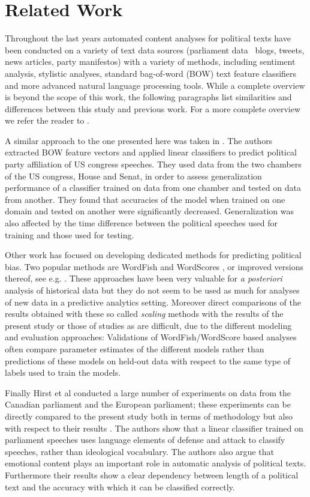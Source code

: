 \documentclass[runningheads,a4paper]{llncs}
\begin{document}
\section{Related Work}\label{sec:related}
Throughout the last years automated content analyses for political texts have been conducted on a variety of text data sources (parliament data \, blogs, tweets, news articles, party manifestos) with a variety of methods, including sentiment analysis, stylistic analyses, standard bag-of-word (BOW) text feature classifiers and more advanced natural language processing tools. 
While a complete overview is beyond the scope of this work, the following paragraphs list similarities and differences between this study and previous work. For a more complete overview we refer the reader to \cite{Grimmer2013,Kaal2014}. 

A similar approach to the one presented here was taken in \cite{Yu2008}. The authors extracted BOW feature vectors and applied linear classifiers to predict political party affiliation of US congress speeches. They used data from the two chambers of the US congress, House and Senat, in order to assess generalization performance of a classifier trained on data from one chamber and tested on data from another. They found that accuracies of the model when trained on one domain and tested on another were significantly decreased. Generalization was also affected by the time difference between the political speeches used for training and those used for testing. 

Other work has focused on developing dedicated methods for predicting political bias. Two popular methods are WordFish \cite{Slapin08ascaling} and WordScores \cite{Laver2003}, or improved versions thereof, see e.g. \cite{Lowe09scalingpolicy}. These approaches have been very valuable for {\em a posteriori} analysis of historical data but they do not seem to be used as much for analyses of new data in a predictive analytics setting. Moreover direct comparisons of the results obtained with these so called {\em scaling} methods with the results of the present study or those of studies as \cite{Yu2008} are difficult, due to the different modeling and evaluation approaches: Validations of WordFish/WordScore based analyses often compare parameter estimates of the different models rather than predictions of these models on held-out data with respect to the same type of labels used to train the models. 

Finally Hirst et al conducted a large number of experiments on data from the Canadian parliament and the European parliament; these experiments can be directly compared to the present study both in terms of methodology but also with respect to their results \cite{Hirst2014}. The authors show that a linear classifier trained on parliament speeches uses language elements of defense and attack to classify speeches, rather than ideological vocabulary. The authors also argue that emotional content plays an important role in automatic analysis of political texts. Furthermore their results show a clear dependency between length of a political text and the accuracy with which it can be classified correctly. 
\end{document}

